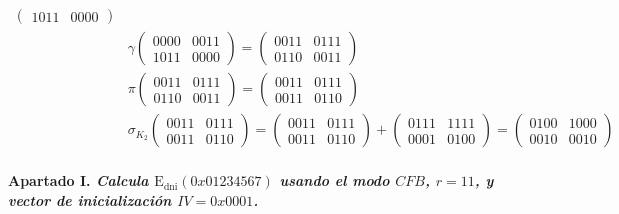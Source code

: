 \documentclass[fleqn]{article}
\begin{document}
\begin{equation*}
\begin{aligned}
\begin{pmatrix}
                1011 & 0000
            \end{pmatrix} \\
            &\gamma \begin{pmatrix}
                0000 & 0011 \\
                1011 & 0000
            \end{pmatrix} =
            \begin{pmatrix}
                0011 & 0111 \\
                0110 & 0011
            \end{pmatrix} \\
            &\pi \begin{pmatrix}
                0011 & 0111 \\
                0110 & 0011
            \end{pmatrix} =
            \begin{pmatrix}
                0011 & 0111 \\
                0011 & 0110
            \end{pmatrix} \\
            &\sigma_{K_2} \begin{pmatrix}
                0011 & 0111 \\
                0011 & 0110
            \end{pmatrix} =
            \begin{pmatrix}
                0011 & 0111 \\
                0011 & 0110
            \end{pmatrix} +
            \begin{pmatrix}
                0111 & 1111 \\
                0001 & 0100
            \end{pmatrix} =
            \begin{pmatrix}
                0100 & 1000 \\
                0010 & 0010
            \end{pmatrix} \\
        \end{aligned}
    \end{equation*}






    \newpage
    \textbf{Apartado I. \textit{Calcula $\text{E}_{\text{dni}}(0x01234567)$ usando el modo $CFB$, $r=11$, y vector de 
            inicialización $IV = 0x0001$.}}\\
\end{document}
